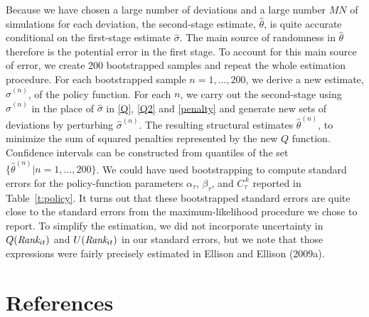 \documentclass[11pt]{article}
\newcommand{\Rank}{\mbox{\it Rank}}
\newcommand{\cut}[1]{C_{\tau}^{\,#1}}
\begin{document}
Because we have chosen a large number of deviations and a large number
$MN$ of simulations for each deviation, the second-stage estimate,
$\hat{\theta}$, is quite accurate conditional on the first-stage
estimate $\hat{\sigma}$. The main source of randomness in
$\hat{\theta}$ therefore is the potential error in the first stage. To
account for this main source of error, we create 200 bootstrapped
samples and repeat the whole estimation procedure.  For each
bootstrapped sample $n = 1, \ldots, 200$, we derive a new estimate,
$\hat{\sigma}^{(n)}$, of the policy function. For each $n$, we carry
out the second-stage using $\hat{\sigma}^{(n)}$ in the place of
$\hat{\sigma}$ in \eqref{Q}, \eqref{Q2} and \eqref{penalty} and
generate new sets of deviations by perturbing $\hat{\sigma}^{(n)}$.
The resulting structural estimates $\hat{\theta}^{(n)}$, to minimize
the sum of squared penalties represented by the new $Q$
function. Confidence intervals can be constructed from quantiles of
the set $\{\hat{\theta}^{(n)} | n = 1,\dots, 200 \}$. We could have
used bootstrapping to compute standard errors for the policy-function
parameters $\alpha_\tau$, $\beta_\tau$, and $\cut{k}$ reported in
Table~\ref{t:policy}. It turns out that these bootstrapped standard
errors are quite close to the standard errors from the
maximum-likelihood procedure we chose to report. To simplify the
estimation, we did not incorporate uncertainty in $Q(\Rank_{it})$ and
$U(\Rank_{it})$ in our standard errors, but we note that those
expressions were fairly precisely estimated in Ellison and Ellison
(2009a).


\newpage

\section*{References}
\end{document}
